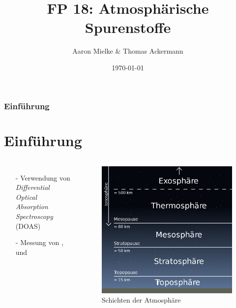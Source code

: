\documentclass{beamer}
\title{FP 18: Atmosphärische Spurenstoffe}
\author{Aaron Mielke \& Thomas Ackermann}
\date{\today}
\begin{document}
\maketitle


\begin{frame}
	\frametitle{Einführung}
    \section{Einführung}
    \begin{columns}
        \begin{itemize}
            \item[-] Verwendung von \textit{Differential Optical Absorption Spectroscopy} (DOAS) 
            \item[-] Messung von ,  und  
        \end{itemize}
    \begin{figure}
        \includegraphics[width=\textwidth]{fig/photo/erdatmosphäre.png}
        \caption{Schichten der Atmosphäre \cite{amt_zones}}
    \end{figure}
    \end{columns}
\end{frame}
\end{document}
